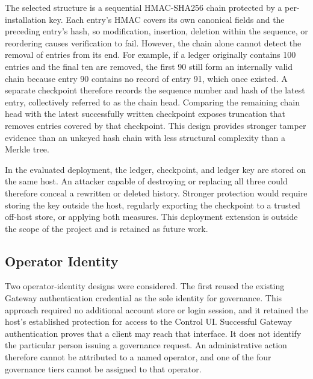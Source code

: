 The selected structure is a sequential HMAC-SHA256 chain protected by a
per-installation key. Each entry's HMAC covers its own canonical fields and the preceding
entry's hash, so modification, insertion, deletion within the sequence, or
reordering causes verification to fail. However, the chain alone cannot detect
the removal of entries from its end. For example, if a ledger originally
contains 100 entries and the final ten are removed, the first 90 still form an
internally valid chain because entry 90 contains no record of entry 91, which once existed. A separate checkpoint therefore records the sequence number and hash
of the latest entry, collectively referred to as the chain head. Comparing the remaining chain head with the latest successfully written
checkpoint exposes truncation that removes entries covered by that checkpoint. This design provides stronger tamper evidence than
an unkeyed hash chain with less structural complexity than a Merkle tree.

In the evaluated deployment, the ledger, checkpoint, and ledger key are stored
on the same host. An attacker capable of destroying or replacing all three
could therefore conceal a rewritten or deleted history. Stronger protection
would require storing the key outside the host, regularly exporting the
checkpoint to a trusted off-host store, or applying both measures. This
deployment extension is outside the scope of the project and is retained as
future work.
\subsection{Operator Identity}
\label{sec:gov-operator-identity}

Two operator-identity designs were considered. The first reused the existing
Gateway authentication credential as the sole identity for governance. This
approach required no additional account store or login session, and it retained
the host's established protection for access to the Control UI. Successful
Gateway authentication proves that a client may reach that interface. It does
not identify the particular person issuing a governance request. An
administrative action therefore cannot be attributed to a named operator, and
one of the four governance tiers cannot be assigned to that operator.

